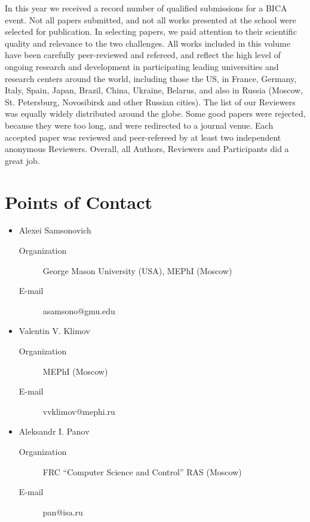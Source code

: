 \documentclass[10pt,fleqn,openany]{book} %
\begin{document}
In this year we received a record number of qualified submissions for a BICA event. Not all papers submitted, and not all works presented at the school were selected for publication. In selecting papers, we paid attention to their scientific quality and relevance to the two challenges. All works included in this volume have been carefully peer-reviewed and refereed, and reflect the high level of ongoing research and development in participating leading universities and research centers around the world, including those the US, in France, Germany, Italy, Spain, Japan, Brazil, China, Ukraine, Belarus, and also in Russia (Moscow, St. Petersburg, Novosibirsk and other Russian cities). The list of our Reviewers was equally widely distributed around the globe. Some good papers were rejected, because they were too long, and were redirected to a journal venue. Each accepted paper was reviewed and peer-refereed by at least two independent anonymous Reviewers. Overall, all Authors, Reviewers and Participants did a great job. 

\section{Points of Contact}

\begin{itemize}
	\item Alexei Samsonovich
		\begin{description}
			\item[Organization] George Mason University (USA), MEPhI (Moscow)
			\item[E-mail] asamsono@gmu.edu
		\end{description} 
	\item Valentin V. Klimov
		\begin{description}
			\item[Organization] MEPhI (Moscow)
			\item[E-mail]  vvklimov@mephi.ru
		\end{description} 
	\item Aleksandr I. Panov
	\begin{description}
		\item[Organization]  FRC “Computer Science and Control” RAS (Moscow)
		\item[E-mail] pan@isa.ru
	\end{description}
		
\end{itemize}

\end{document}
